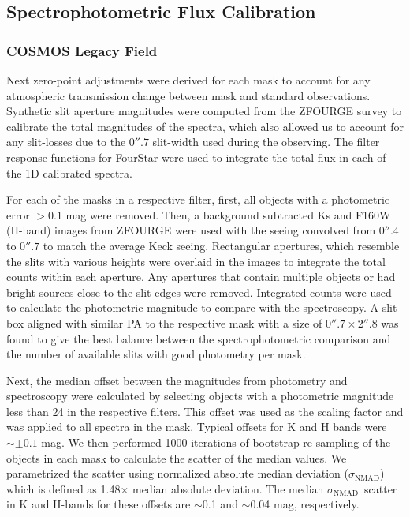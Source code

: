 \documentclass[iop]{emulateapj}
\newcommand{\around}{$\sim$}
\newcommand{\NMAD}{$\sigma_{\mathrm{NMAD}}$}
\begin{document}
\subsection{Spectrophotometric Flux Calibration}
\label{sec:sp calibration}


\subsubsection{COSMOS Legacy Field}

Next zero-point adjustments were derived for each mask to account for any atmospheric transmission change between mask and standard observations. Synthetic slit aperture magnitudes were computed from the ZFOURGE survey to calibrate the total magnitudes of the spectra, which also allowed us to account for any slit-losses due to the $0''.7$ slit-width used during the observing.  
The filter response functions for FourStar \citep{Persson2013} were used to integrate the total flux in each of the 1D calibrated spectra.  

For each of the masks in a respective filter, first,  all objects with a photometric error $>0.1$ mag were removed. 
Then, a background subtracted Ks and F160W (H-band) images from ZFOURGE were used with the seeing convolved from $0''.4$ to $0''.7$ to match the average Keck seeing. 
Rectangular apertures, which resemble the slits with various heights were overlaid in the images to integrate the total counts within each aperture. 
Any apertures that contain multiple objects or had bright sources close to the slit edges were removed. 
Integrated counts were used to calculate the photometric magnitude to compare with the spectroscopy. 
A slit-box aligned with similar PA to the respective mask with a size of $0''.7 \times 2''.8$ was found to give the best balance between the spectrophotometric comparison and the number of available slits with good photometry per mask. 


Next, the median offset between the magnitudes from photometry and spectroscopy were calculated by selecting objects with a photometric magnitude less than 24 in the respective filters.  
This offset was used as the scaling factor and was applied to all spectra in the mask. Typical offsets for K and H bands were $\sim \pm0.1$ mag. 
We then performed 1000 iterations of bootstrap re-sampling of the objects in each mask to calculate the scatter of the median values. We parametrized the scatter using normalized absolute median deviation (\NMAD) which is defined as 1.48$\times$ median absolute deviation. 
The median \NMAD\ scatter in K and H-bands for these offsets are \around0.1 and \around0.04 mag, respectively.
\end{document}

